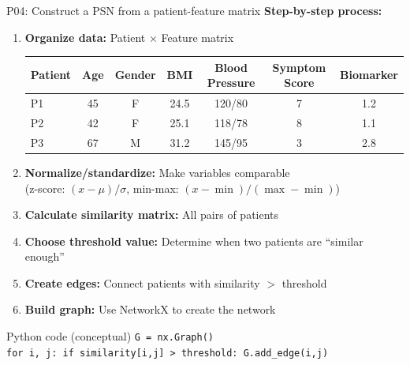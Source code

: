 \documentclass[aspectratio=169, 10pt]{beamer}
\begin{document}
\begin{frame}{P04: Construct a PSN from a patient-feature matrix}
    \textbf{Step-by-step process:}
    
    \begin{enumerate}
        \item \textbf{Organize data:} Patient $\times$ Feature matrix
        \begin{center}
            \scriptsize
            \begin{tabular}{l|cccccc}
                \toprule
                Patient & Age & Gender & BMI & Blood Pressure & Symptom Score & Biomarker \\
                \midrule
                P1 & 45 & F & 24.5 & 120/80 & 7 & 1.2 \\
                P2 & 42 & F & 25.1 & 118/78 & 8 & 1.1 \\
                P3 & 67 & M & 31.2 & 145/95 & 3 & 2.8 \\
                \bottomrule
            \end{tabular}
        \end{center}
        
        \item \textbf{Normalize/standardize:} Make variables comparable\\
        \scriptsize (z-score: $(x-\mu)/\sigma$, min-max: $(x-\min)/(\max-\min)$)
        \normalsize
        
        \item \textbf{Calculate similarity matrix:} All pairs of patients
        
        \item \textbf{Choose threshold value:} Determine when two patients are ``similar enough''
        
        \item \textbf{Create edges:} Connect patients with similarity $>$ threshold
        
        \item \textbf{Build graph:} Use NetworkX to create the network
    \end{enumerate}
    
    \begin{block}{\footnotesize Python code (conceptual)}
        \footnotesize
        \texttt{G = nx.Graph()} \\
        \texttt{for i, j: if similarity[i,j] > threshold: G.add\_edge(i,j)}
    \end{block}
\end{frame}
\end{document}
